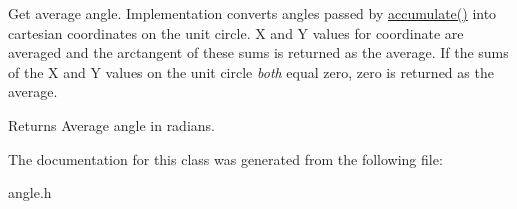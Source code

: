 Get average angle. Implementation converts angles passed by \hyperlink{classquanergy_1_1common_1_1AngleAverager_aac88135f8afaf698748c79f512636d6f}{accumulate()} into cartesian coordinates on the unit circle. X and Y values for coordinate are averaged and the arctangent of these sums is returned as the average. If the sums of the X and Y values on the unit circle {\itshape both} equal zero, zero is returned as the average. 

\begin{DoxyReturn}{Returns}
Average angle in radians. 
\end{DoxyReturn}


The documentation for this class was generated from the following file\-:\begin{DoxyCompactItemize}
\item 
angle.\-h\end{DoxyCompactItemize}
